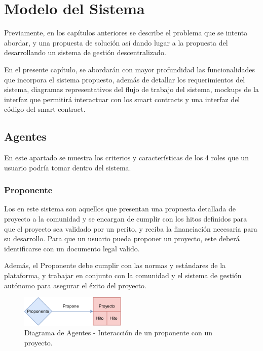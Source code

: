 \section{Modelo del Sistema}

Previamente, en los capítulos anteriores se describe el problema que se intenta abordar, y una propuesta de solución así dando lugar a la propuesta del desarrollando un sistema de gestión descentralizado.

\bigskip

En el presente capítulo, se abordarán con mayor profundidad las funcionalidades que incorpora el sistema propuesto, además de detallar los requerimientos del sistema, diagramas representativos del flujo de trabajo del sistema, mockups de la interfaz que permitirá interactuar con los smart contracts y una interfaz del código del smart contract.

\subsection{Agentes}
En este apartado se muestra los criterios y características de los 4 roles que un usuario podría tomar dentro del sistema.


\subsubsection{Proponente}

Los  en este sistema son aquellos que presentan una propuesta detallada de proyecto a la comunidad y se encargan de cumplir con los hitos definidos para que el proyecto sea validado por un perito, y reciba la financiación necesaria para su desarrollo. Para que un usuario pueda proponer un proyecto, este deberá identificarse con un documento legal valido.

\bigskip

Además, el Proponente debe cumplir con las normas y estándares de la plataforma, y trabajar en conjunto con la comunidad y el sistema de gestión autónomo para asegurar el éxito del proyecto.

\begin{figure}[H]
        \centering
        \includegraphics[width=0.45\textwidth]{img/diagramas/proponente.png}
        \caption{Diagrama de Agentes - Interacción de un proponente con un proyecto.}
        \label{fig:configApi}
\end{figure}

